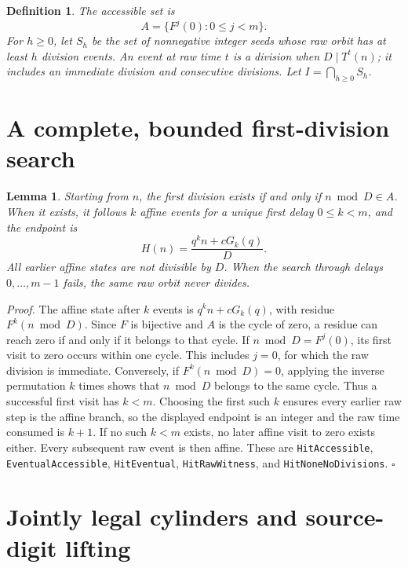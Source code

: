 \documentclass[11pt,letterpaper]{article}
\newtheorem{lemma}[theorem]{Lemma}
\newtheorem{definition}[theorem]{Definition}
\newenvironment{proof}{\noindent\textit{Proof.}}{\hfill\(\square\)}
\begin{document}
\begin{definition}
The accessible set is
\[
A=\{F^j(0):0\le j<m\}.
\]
For \(h\ge0\), let \(S_h\) be the set of nonnegative integer seeds
whose raw orbit has at least \(h\) division events.
An event at raw time \(t\) is a division when \(D\mid T^t(n)\);
it includes an immediate division and consecutive divisions.
Let \(I=\bigcap_{h\ge0}S_h\).
\end{definition}

\section{A complete, bounded first-division search}

\begin{lemma}\label{LemmaSearch}
Starting from \(n\), the first division exists if and only if
\(n\bmod D\in A\). When it exists, it follows \(k\) affine events
for a unique first delay \(0\le k<m\), and the endpoint is
\[
H(n)=\frac{q^kn+cG_k(q)}{D}.
\]
All earlier affine states are not divisible by \(D\).
When the search through delays \(0,\ldots,m-1\) fails,
the same raw orbit never divides.
\end{lemma}
\begin{proof}
The affine state after \(k\) events is \(q^kn+cG_k(q)\), with residue
\(F^k(n\bmod D)\).
Since \(F\) is bijective and \(A\) is the cycle of zero,
a residue can reach zero if and only if it belongs to that cycle.
If \(n\bmod D=F^j(0)\), its first visit to zero occurs within one cycle.
This includes \(j=0\), for which the raw division is immediate.
Conversely, if \(F^k(n\bmod D)=0\), applying the inverse permutation \(k\) times
shows that \(n\bmod D\) belongs to the same cycle.
Thus a successful first visit has \(k<m\).
Choosing the first such \(k\) ensures every earlier raw step is the affine branch,
so the displayed endpoint is an integer and the raw time consumed is \(k+1\).
If no such \(k<m\) exists, no later affine visit to zero exists either.
Every subsequent raw event is then affine.
These are \texttt{HitAccessible}, \texttt{EventualAccessible},
\texttt{HitEventual}, \texttt{HitRawWitness}, and
\texttt{HitNoneNoDivisions}.
\end{proof}

\section{Jointly legal cylinders and source-digit lifting}
\end{document}
